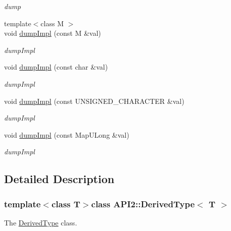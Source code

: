 \begin{DoxyCompactItemize}
\begin{DoxyCompactList}\small\item\em dump \end{DoxyCompactList}\item 
{\footnotesize template$<$class M $>$ }\\void \hyperlink{class_a_p_i2_1_1_derived_type_a1ddbd414c7531a7fa8157f2d83230379}{dump\-Impl} (const M \&val)
\begin{DoxyCompactList}\small\item\em dump\-Impl \end{DoxyCompactList}\item 
void \hyperlink{class_a_p_i2_1_1_derived_type_a38490dff49a40bb45b514a040b60fbe3}{dump\-Impl} (const char \&val)
\begin{DoxyCompactList}\small\item\em dump\-Impl \end{DoxyCompactList}\item 
void \hyperlink{class_a_p_i2_1_1_derived_type_a0b16bf6a210730e844c2bd1d7061d989}{dump\-Impl} (const U\-N\-S\-I\-G\-N\-E\-D\-\_\-\-C\-H\-A\-R\-A\-C\-T\-E\-R \&val)
\begin{DoxyCompactList}\small\item\em dump\-Impl \end{DoxyCompactList}\item 
void \hyperlink{class_a_p_i2_1_1_derived_type_a36c7d5b71b0f2ddbad12948a024b17b8}{dump\-Impl} (const Map\-U\-Long \&val)
\begin{DoxyCompactList}\small\item\em dump\-Impl \end{DoxyCompactList}\end{DoxyCompactItemize}


\subsection{Detailed Description}
\subsubsection*{template$<$class T$>$class A\-P\-I2\-::\-Derived\-Type$<$ T $>$}

The \hyperlink{class_a_p_i2_1_1_derived_type}{Derived\-Type} class. 

